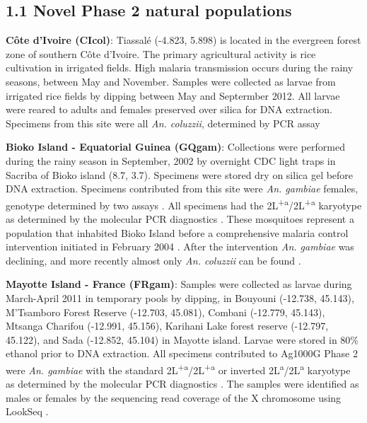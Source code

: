 \documentclass[a4paper,11pt,abstracton,hidelinks]{scrartcl}
\begin{document}
\subsection*{1.1 Novel Phase 2 natural populations}
%
\textbf{C\^{o}te d'Ivoire (CIcol)}: Tiassal\'{e} (-4.823, 5.898) is located in the evergreen forest zone of southern C\^{o}te d'Ivoire.
%
The primary agricultural activity is rice cultivation in irrigated fields.
%
High malaria transmission occurs during the rainy seasons, between May and November.
%
Samples were collected as larvae from irrigated rice fields by dipping between May and Septermber 2012.
%
All larvae were reared to adults and females preserved over silica for DNA extraction.
%
Specimens from this site were all \textit{An. coluzzii}, determined by PCR assay \cite{Santolamazza2008}

\textbf{Bioko Island - Equatorial Guinea (GQgam)}: Collections were performed during the rainy season in September, 2002 by overnight CDC light traps in Sacriba of Bioko island (8.7, 3.7).
%
Specimens were stored dry on silica gel before DNA extraction.
%
Specimens contributed from this site were \textit{An. gambiae} females, genotype determined by two assays \cite{Scott1993, Santolamazza2004}.
%
All specimens had the 2L\textsuperscript{+a}/2L\textsuperscript{+a} karyotype as determined by the molecular PCR diagnostics \cite{White2007}. 
%
These mosquitoes represent a population that inhabited Bioko Island before a comprehensive malaria control intervention initiated in February 2004 \cite{Sharp2007}. 
%
After the intervention \textit{An. gambiae} was declining, and more recently almost only \textit{An. coluzzii} can be found \cite{Overgaard2012}.

%
\textbf{Mayotte Island - France (FRgam)}: Samples were collected as larvae during March-April 2011 in temporary pools by dipping, in Bouyouni (-12.738, 45.143), M'Tsamboro Forest Reserve (-12.703, 45.081), Combani (-12.779, 45.143), Mtsanga Charifou (-12.991, 45.156), Karihani Lake forest reserve (-12.797, 45.122), and Sada (-12.852, 45.104) in Mayotte island.
%
Larvae were stored in 80\% ethanol prior to DNA extraction. 
%
All specimens contributed to Ag1000G Phase 2 were \textit{An. gambiae} \cite{Santolamazza2004} with the standard 2L\textsuperscript{+a}/2L\textsuperscript{+a} or inverted 2L\textsuperscript{a}/2L\textsuperscript{a} karyotype as determined by the molecular PCR diagnostics \cite{White2007}.
%
The samples were identified as males or females by the sequencing read coverage of the X chromosome using LookSeq \cite{Manske2009}.
\end{document}
